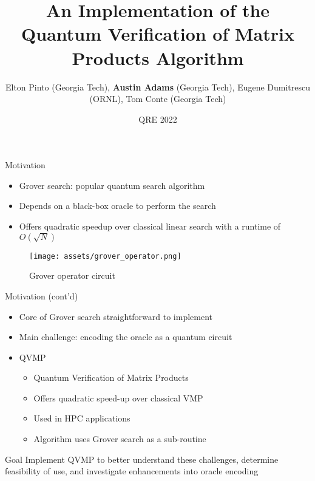 \documentclass[10pt]{beamer}
\title{An Implementation of the Quantum Verification of Matrix Products Algorithm}
\author{Elton Pinto (Georgia Tech), \textbf{Austin Adams} (Georgia Tech), Eugene Dumitrescu (ORNL), Tom Conte (Georgia Tech)}
\date{QRE 2022}
\begin{document}
\begin{frame}[plain]
\titlepage
\end{frame}


\begin{frame}{Motivation}
  \begin{itemize}
    \item Grover search: popular quantum search algorithm
    \item Depends on a black-box oracle to perform the search
    \item Offers quadratic speedup over classical linear search with a
      runtime of $O(\sqrt{N})$
  \end{itemize}
  \begin{figure}
    \centering
    \texttt{[image: assets/grover\_operator.png]}
    \caption{Grover operator circuit}
    \label{fig:grover_operator_circuit}
  \end{figure}
\end{frame}


\begin{frame}{Motivation (cont'd)}
  \begin{itemize}
    \item Core of Grover search straightforward to implement
    \item {
      Main challenge: encoding the oracle as a quantum circuit
    }
    \item {
      QVMP
      \begin{itemize}
        \item Quantum Verification of Matrix Products
        \item Offers quadratic speed-up over classical VMP
        \item Used in HPC applications
        \item Algorithm uses Grover search as a sub-routine
      \end{itemize}
    }
  \end{itemize}

  \begin{alertblock}{Goal}
    Implement QVMP to better understand these challenges, determine feasibility
    of use, and investigate enhancements into oracle encoding
  \end{alertblock}
\end{frame}
\end{document}
